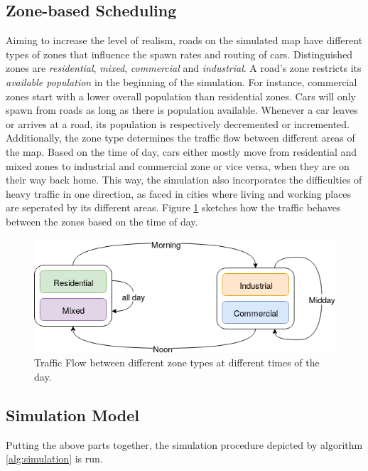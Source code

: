 \documentclass[10pt]{article}
\begin{document}
\subsection{Zone-based Scheduling}
Aiming to increase the level of realism, roads on the simulated map have different types of zones that influence the spawn rates and routing of cars. Distinguished zones are \textit{residential}, \textit{mixed}, \textit{commercial} and \textit{industrial}. A road's zone restricts its \textit{available population} in the beginning of the simulation. For instance, commercial zones start with a lower overall population than residential zones. Cars will only spawn from roads as long as there is population available. Whenever a car leaves or arrives at a road, its population is respectively decremented or incremented. Additionally, the zone type determines the traffic flow between different areas of the map. Based on the time of day, cars either mostly move from residential and mixed zones to industrial and commercial zone or vice versa, when they are on their way back home. This way, the simulation also incorporates the difficulties of heavy traffic in one direction, as faced in cities where living and working places are seperated by its different areas. Figure \ref{fig:zone-traffic-flow} sketches how the traffic behaves between the zones based on the time of day.

\begin{figure}
	\includegraphics[width=\linewidth]{img/zoned-traffic-flow.png}
	\caption{Traffic Flow between different zone types at different times of the day. \label{fig:zone-traffic-flow}}
\end{figure}

\subsection{Simulation Model}
Putting the above parts together, the simulation procedure depicted by algorithm \ref{alg:simulation} is run.
\end{document}
